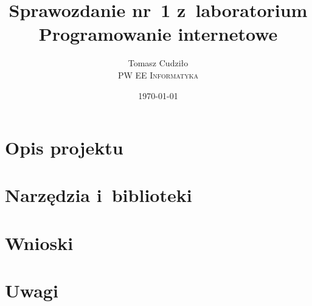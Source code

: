 \documentclass[10pt,a4paper]{article}
\begin{document}
\title{
  Sprawozdanie nr~1 z~laboratorium\\Programowanie internetowe
}
\author{
  Tomasz Cudziło\\
  \textsc{PW EE Informatyka}\\[10pt]
}
\date{\today}
\maketitle

\section{Opis projektu}

\section{Narzędzia i~biblioteki}

\section{Wnioski}

\section{Uwagi}
\end{document}
